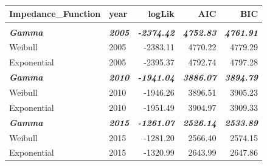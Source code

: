\documentclass[
11pt, %
oneside, %
english, %
singlespacing, %
]{macthesis} %
\begin{document}
\begin{table}
\centering\begingroup\fontsize{9}{11}\selectfont

\begin{tabular}{llrrr}
\toprule
Impedance\_Function & year & logLik & AIC & BIC\\
\midrule
\addlinespace[0.3em]
\multicolumn{5}{l}{\textbf{Destination: Grocery store}}\\
\begingroup\fontsize{10}{12}\selectfont \em{\textbf{\hspace{1em}Gamma}}\endgroup & \begingroup\fontsize{10}{12}\selectfont \em{\textbf{2005}}\endgroup & \begingroup\fontsize{10}{12}\selectfont \em{\textbf{-2374.42}}\endgroup & \begingroup\fontsize{10}{12}\selectfont \em{\textbf{4752.83}}\endgroup & \begingroup\fontsize{10}{12}\selectfont \em{\textbf{4761.91}}\endgroup\\
\hspace{1em}Weibull & 2005 & -2383.11 & 4770.22 & 4779.29\\
\hspace{1em}Exponential & 2005 & -2395.37 & 4792.74 & 4797.28\\
\begingroup\fontsize{10}{12}\selectfont \em{\textbf{\hspace{1em}Gamma}}\endgroup & \begingroup\fontsize{10}{12}\selectfont \em{\textbf{2010}}\endgroup & \begingroup\fontsize{10}{12}\selectfont \em{\textbf{-1941.04}}\endgroup & \begingroup\fontsize{10}{12}\selectfont \em{\textbf{3886.07}}\endgroup & \begingroup\fontsize{10}{12}\selectfont \em{\textbf{3894.79}}\endgroup\\
\hspace{1em}Weibull & 2010 & -1946.26 & 3896.51 & 3905.23\\
\hspace{1em}Exponential & 2010 & -1951.49 & 3904.97 & 3909.33\\
\begingroup\fontsize{10}{12}\selectfont \em{\textbf{\hspace{1em}Gamma}}\endgroup & \begingroup\fontsize{10}{12}\selectfont \em{\textbf{2015}}\endgroup & \begingroup\fontsize{10}{12}\selectfont \em{\textbf{-1261.07}}\endgroup & \begingroup\fontsize{10}{12}\selectfont \em{\textbf{2526.14}}\endgroup & \begingroup\fontsize{10}{12}\selectfont \em{\textbf{2533.89}}\endgroup\\
\hspace{1em}Weibull & 2015 & -1281.20 & 2566.40 & 2574.15\\
\hspace{1em}Exponential & 2015 & -1320.99 & 2643.99 & 2647.86\\

\end{tabular}
\end{table}
\end{document}
